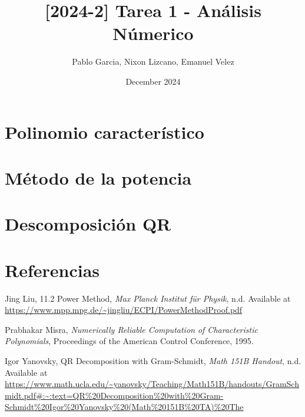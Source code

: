 \documentclass{article}
\title{[2024-2] Tarea 1 - Análisis Númerico}
\author{Pablo Garcia, Nixon Lizcano, Emanuel Velez}
\date{December 2024}
\begin{document}
\maketitle


\section{Polinomio característico}


\section{Método de la potencia}


\section{Descomposición QR}



\section{Referencias}
\begingroup
\renewcommand{\section}[2]{}
\begin{thebibliography}{0}
\setlength{\parskip}{0mm}
\setlength{\itemsep}{-0.3mm}
\small

 Jing Liu, 11.2 Power Method, \textit{Max Planck Institut für Physik}, n.d. Available at \url{https://www.mpp.mpg.de/~jingliu/ECPI/PowerMethodProof.pdf}

 Prabhakar Misra, \textit{Numerically Reliable Computation of Characteristic Polynomials}, Proceedings of the American Control Conference, 1995.

 Igor Yanovsky, QR Decomposition with Gram-Schmidt, \textit{Math 151B Handout}, n.d. Available at \url{https://www.math.ucla.edu/~yanovsky/Teaching/Math151B/handouts/GramSchmidt.pdf#:~:text=QR%20Decomposition%20with%20Gram-Schmidt%20Igor%20Yanovsky%20(Math%20151B%20TA)%20The}

\end{thebibliography}
\endgroup
\end{document}
